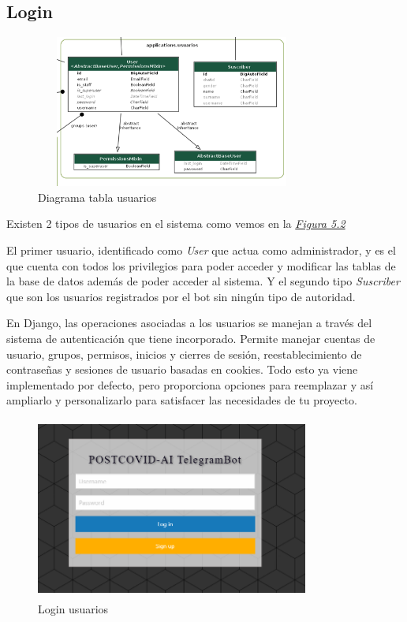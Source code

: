 \subsection{Login}


\begin{figure}[!ht]
    \centering
    \includegraphics[width=0.8\textwidth, height=5cm]{imagenes/usuarios.png}
    \caption{ Diagrama tabla usuarios }
    \label{fig:usuarios}
\end{figure}

Existen 2 tipos de usuarios en el sistema como vemos en la \textit{\hyperref[fig:usuarios]{Figura 5.2}}

El primer usuario, identificado como \textit{User} que actua como administrador, y es el que cuenta con  todos los privilegios para poder acceder y modificar las tablas de la base de datos además de poder acceder al sistema. Y el segundo tipo \textit{Suscriber} que son los usuarios registrados por el bot sin ningún tipo de autoridad. 

En Django, las operaciones asociadas a los usuarios se manejan a través del sistema de autenticación que tiene incorporado. Permite manejar cuentas de usuario, grupos, permisos, inicios y cierres de sesión, reestablecimiento de contraseñas y sesiones de usuario basadas en cookies. Todo esto ya viene implementado por defecto, pero proporciona opciones para reemplazar y así ampliarlo y personalizarlo para satisfacer las necesidades de tu proyecto.


\begin{figure}[!ht]
    \centering
    \includegraphics[width=0.8\textwidth, height=6cm]{imagenes/login.png}
    \caption{ Login usuarios }
    \label{fig:login}
\end{figure}

